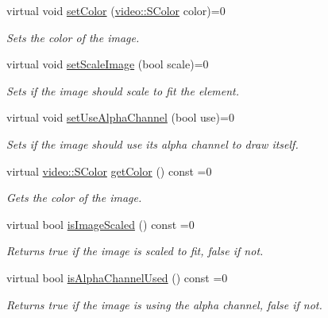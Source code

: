 \begin{DoxyCompactItemize}
virtual void \hyperlink{classirr_1_1gui_1_1IGUIImage_ac836018aafc61f6b9fe88acfa2267d8e}{set\+Color} (\hyperlink{classirr_1_1video_1_1SColor}{video\+::\+S\+Color} color)=0
\begin{DoxyCompactList}\small\item\em Sets the color of the image. \end{DoxyCompactList}\item 
\mbox{\label{classirr_1_1gui_1_1IGUIImage_a642c5683600be82efa0cc04b4236e34d}} 
virtual void \hyperlink{classirr_1_1gui_1_1IGUIImage_a642c5683600be82efa0cc04b4236e34d}{set\+Scale\+Image} (bool scale)=0
\begin{DoxyCompactList}\small\item\em Sets if the image should scale to fit the element. \end{DoxyCompactList}\item 
\mbox{\label{classirr_1_1gui_1_1IGUIImage_a9426b40769f4ef7614e6a94dcfa67455}} 
virtual void \hyperlink{classirr_1_1gui_1_1IGUIImage_a9426b40769f4ef7614e6a94dcfa67455}{set\+Use\+Alpha\+Channel} (bool use)=0
\begin{DoxyCompactList}\small\item\em Sets if the image should use its alpha channel to draw itself. \end{DoxyCompactList}\item 
\mbox{\label{classirr_1_1gui_1_1IGUIImage_a46a6dc23dd045cb65247344bf71078e4}} 
virtual \hyperlink{classirr_1_1video_1_1SColor}{video\+::\+S\+Color} \hyperlink{classirr_1_1gui_1_1IGUIImage_a46a6dc23dd045cb65247344bf71078e4}{get\+Color} () const =0
\begin{DoxyCompactList}\small\item\em Gets the color of the image. \end{DoxyCompactList}\item 
\mbox{\label{classirr_1_1gui_1_1IGUIImage_aca24045ee740242b9c8de73a8f609a27}} 
virtual bool \hyperlink{classirr_1_1gui_1_1IGUIImage_aca24045ee740242b9c8de73a8f609a27}{is\+Image\+Scaled} () const =0
\begin{DoxyCompactList}\small\item\em Returns true if the image is scaled to fit, false if not. \end{DoxyCompactList}\item 
\mbox{\label{classirr_1_1gui_1_1IGUIImage_a5be6faec4c156fc955c84a5b3f703d63}} 
virtual bool \hyperlink{classirr_1_1gui_1_1IGUIImage_a5be6faec4c156fc955c84a5b3f703d63}{is\+Alpha\+Channel\+Used} () const =0
\begin{DoxyCompactList}\small\item\em Returns true if the image is using the alpha channel, false if not. \end{DoxyCompactList}\end{DoxyCompactItemize}
